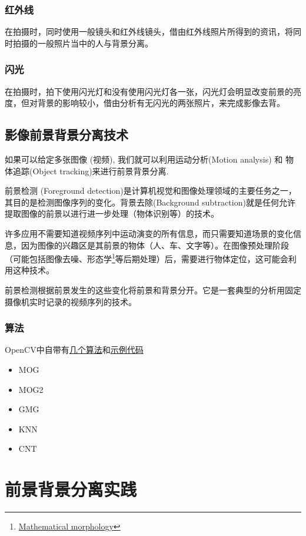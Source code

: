 \documentclass[scheme=chinese,a4paper]{article}
\begin{document}
\subsubsection{红外线}
在拍摄时，同时使用一般镜头和红外线镜头，借由红外线照片所得到的资讯，将同时拍摄的一般照片当中的人与背景分离。
\subsubsection{闪光}
在拍摄时，拍下使用闪光灯和没有使用闪光灯各一张，闪光灯会明显改变前景的亮度，但对背景的影响较小，借由分析有无闪光的两张照片，来完成影像去背。
\subsection{影像前景背景分离技术}
如果可以给定多张图像 (视频), 我们就可以利用运动分析(Motion analysis) 和 物体追踪(Object tracking)来进行前景背景分离. 

前景检测 (Foreground detection)是计算机视觉和图像处理领域的主要任务之一，其目的是检测图像序列的变化。背景去除(Background subtraction)就是任何允许提取图像的前景以进行进一步处理（物体识别等）的技术。

许多应用不需要知道视频序列中运动演变的所有信息，而只需要知道场景的变化信息，因为图像的兴趣区是其前景的物体（人、车、文字等）。在图像预处理阶段（可能包括图像去噪、形态学\footnote{\href{https://en.wikipedia.org/wiki/Mathematical_morpholog}{Mathematical morphology}}等后期处理）后，需要进行物体定位，这可能会利用这种技术。

前景检测根据前景发生的这些变化将前景和背景分开。它是一套典型的分析用固定摄像机实时记录的视频序列的技术。
\subsubsection{算法}
OpenCV中自带有\href{https://docs.opencv.org/master/de/de1/group__video__motion.html}{几个算法}和\href{https://docs.opencv.org/master/d1/dc5/tutorial_background_subtraction.html}{示例代码}
\begin{itemize}
  \item MOG
  \item MOG2
  \item GMG 
  \item KNN
  \item CNT
\end{itemize}
\section{前景背景分离实践}
\end{document}
